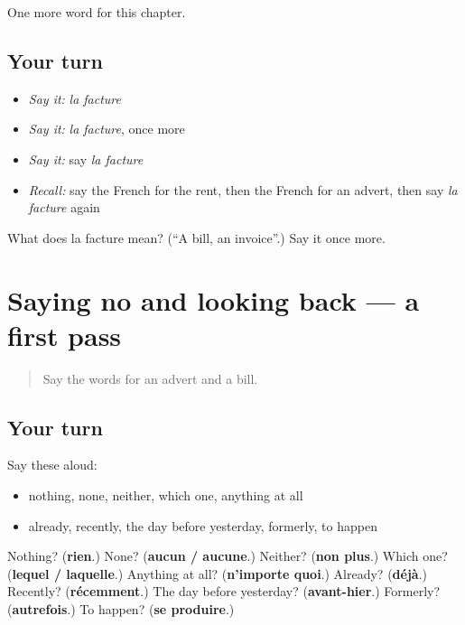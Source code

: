 \begin{grammarlens}[title={What you've built}]
One more word for this chapter.
\end{grammarlens}

\subsection*{Your turn}
\begin{itemize}
\raggedright
  \item \emph{Say it:} \emph{la facture}
  \item \emph{Say it:} \emph{la facture}, once more
  \item \emph{Say it:} say \emph{la facture}
  \item \emph{Recall:} say the French for the rent, then the French for an advert, then say \emph{la facture} again
\end{itemize}

\begin{tcolorbox}[breakable,colback=teal!4,colframe=teal!35!black,title={Before you move on}]
What does la facture mean? (\textquotedblleft{}A bill, an invoice\textquotedblright{}.) Say it once more.
\end{tcolorbox}
\section[(dialogue)]{Saying no and looking back — a first pass}

\label{lesson:FR-R142-first-pass-saying-no-and-looking-back}



\begin{quote}
Say the words for an advert and a bill.
\end{quote}

\subsection*{Your turn}
Say these aloud:

\begin{itemize}
\raggedright
  \item nothing, none, neither, which one, anything at all
  \item already, recently, the day before yesterday, formerly, to happen
\end{itemize}

\begin{tcolorbox}[breakable,colback=teal!4,colframe=teal!35!black,title={Before you move on}]
Nothing? (\textbf{rien}.) None? (\textbf{aucun / aucune}.) Neither? (\textbf{non plus}.) Which one? (\textbf{lequel / laquelle}.) Anything at all? (\textbf{n'importe quoi}.) Already? (\textbf{déjà}.) Recently? (\textbf{récemment}.) The day before yesterday? (\textbf{avant-hier}.) Formerly? (\textbf{autrefois}.) To happen? (\textbf{se produire}.)
\end{tcolorbox}
